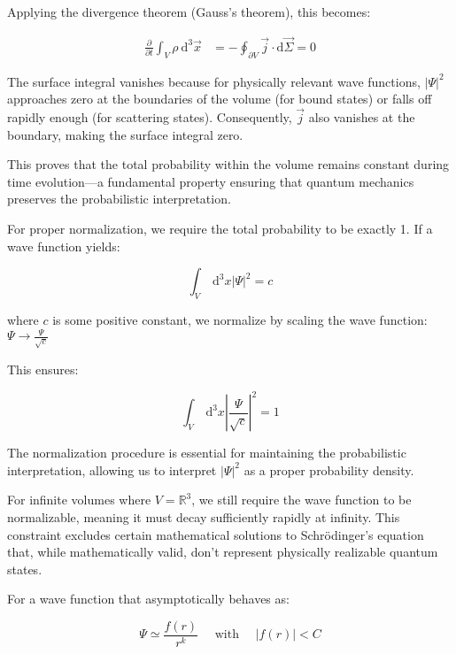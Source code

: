 \documentclass[10pt]{article}
\begin{document}
Applying the divergence theorem (Gauss's theorem), this becomes:

\begin{align*}
\frac{\partial}{\partial t} \int_{V} \rho \mathrm{~d}^{3} \vec{x} &= -\oint_{\partial V} \vec{j} \cdot \mathrm{d} \vec{\Sigma} = 0
\end{align*}

The surface integral vanishes because for physically relevant wave functions, $|\Psi|^2$ approaches zero at the boundaries of the volume (for bound states) or falls off rapidly enough (for scattering states). Consequently, $\vec{j}$ also vanishes at the boundary, making the surface integral zero.

This proves that the total probability within the volume remains constant during time evolution—a fundamental property ensuring that quantum mechanics preserves the probabilistic interpretation.

For proper normalization, we require the total probability to be exactly 1. If a wave function yields:

\begin{equation*}
\int_{V} \mathrm{~d}^{3} x|\Psi|^{2}=c \tag{1.38}
\end{equation*}

where $c$ is some positive constant, we normalize by scaling the wave function:
$\Psi \rightarrow \frac{\Psi}{\sqrt{c}}$

This ensures:

\begin{equation*}
\int_{V} \mathrm{~d}^{3} x\left|\frac{\Psi}{\sqrt{c}}\right|^{2}=1 \tag{1.39}
\end{equation*}

The normalization procedure is essential for maintaining the probabilistic interpretation, allowing us to interpret $|\Psi|^2$ as a proper probability density.

For infinite volumes where $V=\mathbb{R}^{3}$, we still require the wave function to be normalizable, meaning it must decay sufficiently rapidly at infinity. This constraint excludes certain mathematical solutions to Schrödinger's equation that, while mathematically valid, don't represent physically realizable quantum states.


For a wave function that asymptotically behaves as:

\begin{equation*}
\Psi \simeq \frac{f(r)}{r^{k}} \quad \text { with } \quad|f(r)|<C \tag{1.40}
\end{equation*}
\end{document}
